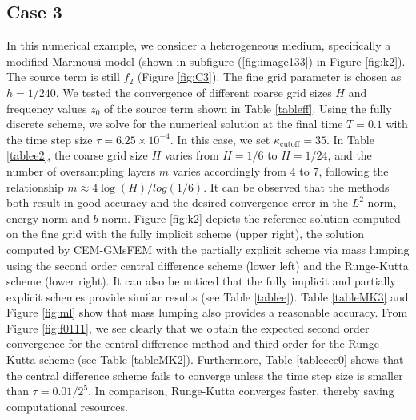 \documentclass[preprint,12pt]{elsarticle}
\begin{document}
\subsection{Case 3}
In this numerical example, we consider a heterogeneous medium, specifically a modified Marmousi model (shown in subfigure (\ref{fig:image133}) in Figure \ref{fig:k2}). The source term is still $f_2$  (Figure \ref{fig:C3}). The fine grid parameter is chosen as $h=1/240$. We tested the convergence of different coarse grid sizes $H$ and frequency values $z_0$ of the source term shown in Table \ref{tableff}.
Using the fully discrete scheme, we solve for the numerical solution at the final time $T=0.1$ with the time step size $\tau=6.25\times10^{-4}$.  In this case, we set $\kappa_{\text{cutoff}}=35$. In Table \ref{tablee2}, the coarse grid size $H$ varies from $H=1/6$ to $H=1/24$, and the number of oversampling layers $m$ varies accordingly from $4$ to $7$, following the relationship $m\approx4\log(H)/log(1/6)$. It can be observed that the methods both result in good accuracy and the desired convergence error in the $L^2$ norm, energy norm and $b$-norm.
Figure \ref{fig:k2} depicts the reference solution computed on the fine grid with the fully implicit scheme (upper right), the solution computed by CEM-GMsFEM with the partially explicit scheme via mass lumping using the second order central difference scheme (lower left) and the Runge-Kutta scheme (lower right).
It can also be noticed that the fully implicit and partially explicit schemes provide similar results (see Table \ref{tablee}). Table \ref{tableMK3} and Figure \ref{fig:ml} show that mass lumping also provides a reasonable accuracy. From Figure \ref{fig:f0111}, we see clearly that we obtain the expected second order convergence for the central difference method and third order for the Runge-Kutta scheme (see Table \ref{tableMK2}). Furthermore, Table \ref{tablecee0} shows that the central difference scheme fails to converge unless the time step size is smaller than $\tau=0.01/2^5$. In comparison, Runge-Kutta converges faster, thereby saving computational resources.
\end{document}
